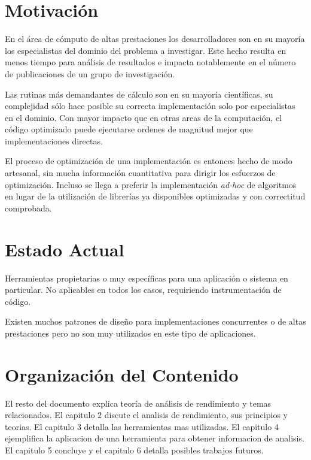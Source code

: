 \documentclass[a4paper]{report}
\begin{document}
\section{Motivaci\'on}

En el \'area de c\'omputo de altas prestaciones los desarrolladores son en su mayor\'ia los especialistas del dominio del problema a investigar.
Este hecho resulta en menos tiempo para an\'alisis de resultados e impacta notablemente en el n\'umero de publicaciones de un grupo de investigaci\'on.

\bigskip

Las rutinas m\'as demandantes de c\'alculo son en su mayor\'ia cient\'ificas, su complejidad s\'olo hace posible su correcta implementaci\'on solo por especialistas en el dominio.
Con mayor impacto que en otras areas de la computaci\'on, el c\'odigo optimizado puede ejecutarse ordenes de magnitud mejor que implementaciones directas.

\bigskip

El proceso de optimizaci\'on de una implementaci\'on es entonces hecho de modo artesanal, sin mucha informaci\'on cuantitativa para dirigir los esfuerzos de optimizaci\'on.
Incluso se llega a preferir la implementaci\'on {\em ad-hoc} de algoritmos en lugar de la utilizaci\'on de librer\'ias ya disponibles optimizadas y con correctitud comprobada.

\section{Estado Actual}

Herramientas propietarias o muy espec\'ificas para una aplicaci\'on o sistema en particular. No aplicables en todos los casos, requiriendo instrumentaci\'on de c\'odigo.

\bigskip

Existen muchos patrones de dise\~no para implementaciones concurrentes o de altas prestaciones pero no son muy utilizados en este tipo de aplicaciones.

\section{Organizaci\'on del Contenido}

El resto del documento explica teor\'ia de an\'alisis de rendimiento y temas
relacionados. El capitulo 2 discute el analisis de rendimiento, sus principios y teorias.
El capitulo 3 detalla las herramientas mas utilizadas. El capitulo 4 ejemplifica la aplicacion de una herramienta para obtener informacion de analisis.
El capitulo 5 concluye y el capitulo 6 detalla posibles trabajos futuros.
\end{document}
